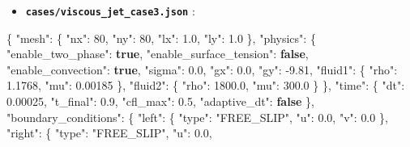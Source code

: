 \documentclass[
  10pt,
]{article}
\newenvironment{Shaded}{}{}
\newcommand{\DataTypeTok}[1]{\textcolor[rgb]{0.56,0.13,0.00}{#1}}
\newcommand{\DecValTok}[1]{\textcolor[rgb]{0.25,0.63,0.44}{#1}}
\newcommand{\FloatTok}[1]{\textcolor[rgb]{0.25,0.63,0.44}{#1}}
\newcommand{\FunctionTok}[1]{\textcolor[rgb]{0.02,0.16,0.49}{#1}}
\newcommand{\KeywordTok}[1]{\textcolor[rgb]{0.00,0.44,0.13}{\textbf{#1}}}
\newcommand{\StringTok}[1]{\textcolor[rgb]{0.25,0.44,0.63}{#1}}
\providecommand{\tightlist}{%
  \setlength{\itemsep}{0pt}\setlength{\parskip}{0pt}}
\begin{document}
\begin{itemize}
\tightlist
\item
  \textbf{\texttt{cases/viscous\_jet\_case3.json}} :
\end{itemize}

\begin{Shaded}
\begin{Highlighting}[]
\FunctionTok{\{}
  \DataTypeTok{"mesh"}\FunctionTok{:} \FunctionTok{\{}
    \DataTypeTok{"nx"}\FunctionTok{:} \DecValTok{80}\FunctionTok{,}
    \DataTypeTok{"ny"}\FunctionTok{:} \DecValTok{80}\FunctionTok{,}
    \DataTypeTok{"lx"}\FunctionTok{:} \FloatTok{1.0}\FunctionTok{,}
    \DataTypeTok{"ly"}\FunctionTok{:} \FloatTok{1.0}
  \FunctionTok{\},}
  \DataTypeTok{"physics"}\FunctionTok{:} \FunctionTok{\{}
    \DataTypeTok{"enable\_two\_phase"}\FunctionTok{:} \KeywordTok{true}\FunctionTok{,}
    \DataTypeTok{"enable\_surface\_tension"}\FunctionTok{:} \KeywordTok{false}\FunctionTok{,}
    \DataTypeTok{"enable\_convection"}\FunctionTok{:} \KeywordTok{true}\FunctionTok{,}
    \DataTypeTok{"sigma"}\FunctionTok{:} \FloatTok{0.0}\FunctionTok{,}
    \DataTypeTok{"gx"}\FunctionTok{:} \FloatTok{0.0}\FunctionTok{,}
    \DataTypeTok{"gy"}\FunctionTok{:} \FloatTok{{-}9.81}\FunctionTok{,}
    \DataTypeTok{"fluid1"}\FunctionTok{:} \FunctionTok{\{}
      \DataTypeTok{"rho"}\FunctionTok{:} \FloatTok{1.1768}\FunctionTok{,}
      \DataTypeTok{"mu"}\FunctionTok{:} \FloatTok{0.00185}
    \FunctionTok{\},}
    \DataTypeTok{"fluid2"}\FunctionTok{:} \FunctionTok{\{}
      \DataTypeTok{"rho"}\FunctionTok{:} \FloatTok{1800.0}\FunctionTok{,}
      \DataTypeTok{"mu"}\FunctionTok{:} \FloatTok{300.0}
    \FunctionTok{\}}
  \FunctionTok{\},}
  \DataTypeTok{"time"}\FunctionTok{:} \FunctionTok{\{}
    \DataTypeTok{"dt"}\FunctionTok{:} \FloatTok{0.00025}\FunctionTok{,}
    \DataTypeTok{"t\_final"}\FunctionTok{:} \FloatTok{0.9}\FunctionTok{,}
    \DataTypeTok{"cfl\_max"}\FunctionTok{:} \FloatTok{0.5}\FunctionTok{,}
    \DataTypeTok{"adaptive\_dt"}\FunctionTok{:} \KeywordTok{false}
  \FunctionTok{\},}
  \DataTypeTok{"boundary\_conditions"}\FunctionTok{:} \FunctionTok{\{}
    \DataTypeTok{"left"}\FunctionTok{:} \FunctionTok{\{}
      \DataTypeTok{"type"}\FunctionTok{:} \StringTok{"FREE\_SLIP"}\FunctionTok{,}
      \DataTypeTok{"u"}\FunctionTok{:} \FloatTok{0.0}\FunctionTok{,}
      \DataTypeTok{"v"}\FunctionTok{:} \FloatTok{0.0}
    \FunctionTok{\},}
    \DataTypeTok{"right"}\FunctionTok{:} \FunctionTok{\{}
      \DataTypeTok{"type"}\FunctionTok{:} \StringTok{"FREE\_SLIP"}\FunctionTok{,}
      \DataTypeTok{"u"}\FunctionTok{:} \FloatTok{0.0}\FunctionTok{,}

\end{Highlighting}
\end{Shaded}
\end{document}

